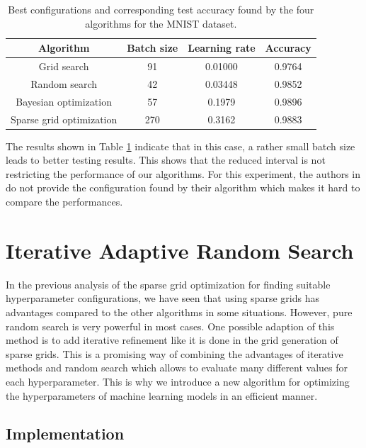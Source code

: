 \begin{table}[H]
	\caption{ Best configurations and corresponding test accuracy found by the four algorithms for the MNIST dataset. }
	\label{tab:configs_MNIST_comp}
	\centering
	\begin{tabular}{| c c c c |} 
		\hline
		Algorithm & Batch size & Learning rate & Accuracy \\ 
		\hline
		Grid search & 91 & 0.01000 & 0.9764 \\ 
		Random search & 42 & 0.03448 & 0.9852 \\ 
		Bayesian optimization & 57 & 0.1979 & 0.9896 \\ 
		Sparse grid optimization & 270 & 0.3162 & 0.9883 \\ 
		\hline
	\end{tabular}
\end{table}

The results shown in Table \ref{tab:configs_MNIST_comp} indicate that in this case, a rather small batch size leads to better testing results. This shows that the reduced interval is not restricting the performance of our algorithms. For this experiment, the authors in \cite{WU201926} do not provide the configuration found by their algorithm which makes it hard to compare the performances. 


\section{Iterative Adaptive Random Search}

In the previous analysis of the sparse grid optimization for finding suitable hyperparameter configurations, we have seen that using sparse grids has advantages compared to the other algorithms in some situations. However, pure random search is very powerful in most cases. One possible adaption of this method is to add iterative refinement like it is done in the grid generation of sparse grids. This is a promising way of combining the advantages of iterative methods and random search which allows to evaluate many different values for each hyperparameter. This is why we introduce a new algorithm for optimizing the hyperparameters of machine learning models in an efficient manner.

\subsection{Implementation}

